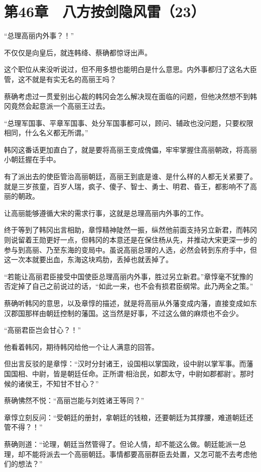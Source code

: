 \section{第46章　八方按剑隐风雷（23）}

“总理高丽内外事？！”

不仅仅是向皇后，就连韩绛、蔡确都惊讶出声。

这个职位从来没听说过，但不用多想也能明白是什么意思。内外事都归了这名大臣管，这不就是有实无名的高丽王吗？

蔡确考虑过一贯爱别出心裁的韩冈会怎么解决现在面临的问题，但他决然想不到韩冈竟然会起意派一个高丽王过去。

“总理军国事、平章军国事、处分军国事都可以，顾问、辅政也没问题，只要权限相同，什么名义都无所谓。”

韩冈这番话更加直白了，就是要将高丽王变成傀儡，牢牢掌握住高丽朝政，将高丽小朝廷握在手中。

有了派出去的使臣管治高丽朝廷，高丽王到底是谁、是什么样的人都无关紧要了。就是三岁孩童，百岁人瑞，疯子、傻子、智士、勇士、明君、昏王，都影响不了高丽的朝政。

让高丽能够遵循大宋的需求行事，这就是总理高丽内外事的工作。

终于等到了韩冈出言相助，章惇精神陡然一振，纵然他前面支持另立新君，而韩冈则说留着王勋更好一点，但韩冈的本意还是在保住杨从先，并推动大宋更深一步的参与到高丽、乃至东海的变局中。虽说高丽总理的人选，必然会转到东府手中，但这一次本就要出血，东海这块鸡肋，丢掉也就丢掉了。

“若能让高丽君臣接受中国使臣总理高丽内外事，胜过另立新君。”章惇毫不犹豫的否定掉了自己之前说过的话，“如此一来，也不会有损君臣纲常。此乃两全之策。”

蔡确听韩冈的意思，以及章惇的描述，就是将高丽从外藩变成内藩，直接变成如东汉郡国那样由朝廷控制的藩国。这当然是好事，不过这么做的麻烦也不会少。

“高丽君臣岂会甘心？！”

他看着韩冈，期待韩冈给他一个让人满意的回答。

但出言反驳的是章惇：“汉时分封诸王，设国相以掌国政，设中尉以掌军事。而藩国国相、中尉，皆是朝廷任命。正所谓‘相治民，如郡太守，中尉如郡都尉’。那时候的诸侯王，不知甘不甘心？”

蔡确怫然不悦：“高丽岂能与刘姓诸王等同？”

章惇立刻反问：“受朝廷的册封，拿朝廷的钱粮，还要朝廷为其撑腰，难道朝廷还管不得？！”

蔡确则道：“论理，朝廷当然管得了。但论人情，却不能这么做。朝廷能派一总理，却不能将派去一个高丽朝廷。事情都要高丽群臣去处置，又怎可能不去考虑他们的想法？”

